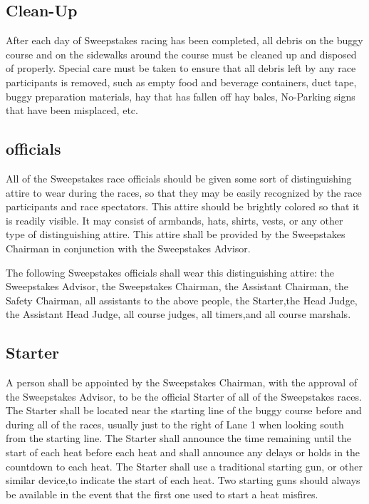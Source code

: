 \documentclass[openany]{book}
\begin{document}
\subsection{Clean-Up}

After each day of Sweepstakes racing has been completed, all debris on the buggy course and on the sidewalks around the course must be cleaned up and disposed of properly. Special care must be taken to ensure that all debris left by any race participants is removed, such as empty food and beverage containers, duct tape, buggy preparation materials, hay that has fallen off hay bales, No-Parking signs that have been misplaced, etc.

\subsection{officials}

All of the Sweepstakes race officials should be given some sort of distinguishing attire to wear during the races, so that they may be easily recognized by the race participants and race spectators. This attire should be brightly colored so that it is readily visible. It may consist of armbands, hats, shirts, vests, or any other type of distinguishing attire. This attire shall be provided by the Sweepstakes Chairman in conjunction with the Sweepstakes Advisor.

The following Sweepstakes officials shall wear this distinguishing attire: the Sweepstakes Advisor, the Sweepstakes Chairman, the Assistant Chairman, the Safety Chairman, all assistants to the above people, the Starter,the Head Judge, the Assistant Head Judge, all course judges, all timers,and all course marshals.

\subsection{Starter}

A person shall be appointed by the Sweepstakes Chairman, with the approval of the Sweepstakes Advisor, to be the official Starter of all of the Sweepstakes races. The Starter shall be located near the starting line of the buggy course before and during all of the races, usually just to the right of Lane 1 when looking south from the starting line. The Starter shall announce the time remaining until the start of each heat before each heat and shall announce any delays or holds in the countdown to each heat. The Starter shall use a traditional starting gun, or other similar device,to indicate the start of each heat. Two starting guns should always be available in the event that the first one used to start a heat misfires.
\end{document}
